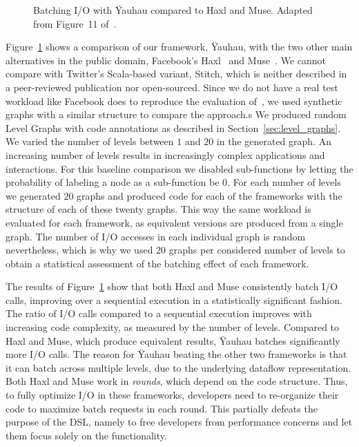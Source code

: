 \begin{figure}[t]
    	\centering
		\caption{Batching \ac{I/O} with \"{Y}auhau compared to Haxl and Muse. Adapted from Figure~11 of~\cite{ertel_cc18}.}	
		\label{fig:yauhau_baseline}
\end{figure}

Figure~\ref{fig:yauhau_baseline} shows a comparison of our framework, \"{Y}auhau, with the two other main alternatives in the public domain, Facebook's Haxl~\cite{marlow2014haxl} and Muse~\cite{muse}.
We cannot compare with Twitter's Scala-based variant, Stitch\cite{stitch}, which is neither described in a peer-reviewed publication nor open-sourced.
Since we do not have a real test workload like Facebook does to reproduce the evaluation of~\cite{marlow2014haxl}, we used synthetic graphs with a similar structure to compare the approach.s
We produced random Level Graphs with code annotations as described in Section~\ref{sec:level_graphs}. 
We varied the number of levels between $1$ and $20$ in the generated graph.
An increasing number of levels results in increasingly complex applications and interactions.
For this baseline comparison we disabled sub-functions by letting the probability of labeling a node as a sub-function be $0$.
For each number of levels we generated $20$ graphs and produced code for each of the frameworks with the structure of each of these twenty graphs.
This way the same workload is evaluated for each framework, as equivalent versions are produced from a single graph.
The number of \ac{I/O} accesses in each individual graph is random nevertheless, which is why we used $20$ graphs per considered number of levels to obtain a statistical assessment of the batching effect of each framework.

The results of Figure~\ref{fig:yauhau_baseline} show that both Haxl and Muse consistently batch \ac{I/O} calls, improving over a sequential execution in a statistically significant fashion.
The ratio of \ac{I/O} calls compared to a sequential execution improves with increasing code complexity, as measured by the number of levels. 
Compared to Haxl and Muse, which produce equivalent results, \"{Y}auhau batches significantly more \ac{I/O} calls.
The reason for \"{Y}auhau beating the other two frameworks is that it can batch across multiple levels, due to the underlying dataflow representation.
Both Haxl and Muse work in \emph{rounds}, which depend on the code structure.
Thus, to fully optimize \ac{I/O} in these frameworks, developers need to re-organize their code to maximize batch requests in each round.
This partially defeats the purpose of the \ac{DSL}, namely to free developers from performance concerns and let them focus solely on the functionality.

